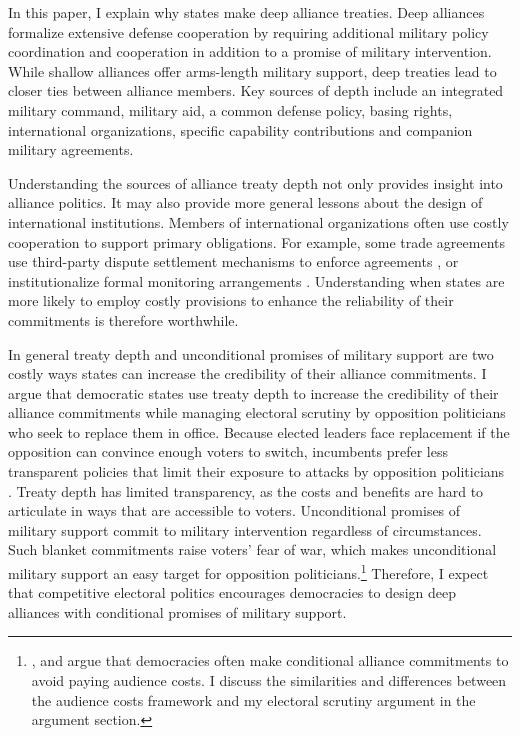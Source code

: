 \documentclass[12pt]{article}
\begin{document}
In this paper, I explain why states make deep alliance treaties. 
Deep alliances formalize extensive defense cooperation by requiring additional military policy coordination and cooperation in addition to a promise of military intervention. 
While shallow alliances offer arms-length military support, deep treaties lead to closer ties between alliance members. 
Key sources of depth include an integrated military command, military aid, a common defense policy, basing rights, international organizations, specific capability contributions and companion military agreements. 


Understanding the sources of alliance treaty depth not only provides insight into alliance politics.
It may also provide more general lessons about the design of international institutions. 
Members of international organizations often use costly cooperation to support primary obligations. 
For example, some trade agreements use third-party dispute settlement mechanisms to enforce agreements \citep{Smith2000}, or institutionalize formal monitoring arrangements \citep{Duretal2013}.  
Understanding when states are more likely to employ costly provisions to enhance the reliability of their commitments is therefore worthwhile. 


In general treaty depth and unconditional promises of military support are two costly ways states can increase the credibility of their alliance commitments.
I argue that democratic states use treaty depth to increase the credibility of their alliance commitments while managing electoral scrutiny by opposition politicians who seek to replace them in office.
Because elected leaders face replacement if the opposition can convince enough voters to switch, incumbents prefer less transparent policies that limit their exposure to attacks by opposition politicians \citep{Kono2006}.
Treaty depth has limited transparency, as the costs and benefits are hard to articulate in ways that are accessible to voters. 
Unconditional promises of military support commit to military intervention regardless of circumstances.  
Such blanket commitments raise voters' fear of war, which makes unconditional military support an easy target for opposition politicians.\footnote{\citet{Mattes2012}, \citet{Chibaetal2015} and \citet{FjelstulReiter2019} argue that democracies often make conditional alliance commitments to avoid paying audience costs. I discuss the similarities and differences between the audience costs framework and my electoral scrutiny argument in the argument section.} 
Therefore, I expect that competitive electoral politics encourages democracies to design deep alliances with conditional promises of military support. 
\end{document}
